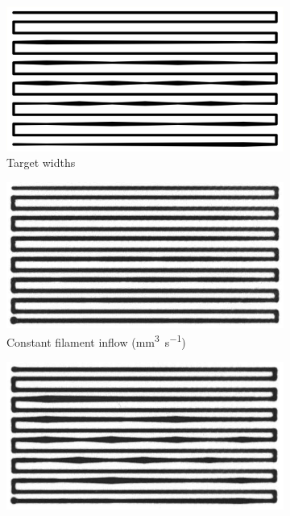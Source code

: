 {\begin{figure}
\centering
\setlength{\figwidth}{0.32\columnwidth}
\setlength{\figheight}{0.5\columnwidth}
\begin{subfigure}[t]{\figwidth}\centering
\includegraphics[angle=90,height=\figheight]{sources-validation-backpressure-compensation-target.pdf}
\caption{Target widths}\label{back_pressure_target}
\end{subfigure}
\begin{subfigure}[t]{\figwidth}\centering
\includegraphics[angle=90,height=\figheight]{sources-validation-zero-backpressure-compensation.png}
\caption{Constant filament inflow (\si{\milli\meter\cubed\per\second})}\label{zero_back_pressure}
\end{subfigure}
\begin{subfigure}[t]{\figwidth}\centering
\includegraphics[angle=90,height=\figheight]{sources-validation-backpressure-compensation.png}

\end{subfigure}
\end{figure}}
